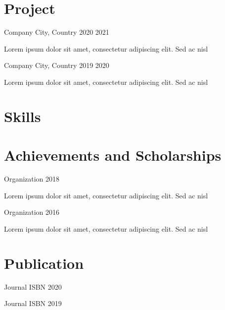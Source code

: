 \documentclass[english]{currivitae-elegant}
\begin{document}
\section[\faProjectDiagram]{Project}
           {Company}
           {City, Country}
           {2020}
           {2021}
           {
            \begin{compactitem}[]
                \item Lorem ipsum dolor sit amet, consectetur adipiscing elit. Sed ac nisl
            \end{compactitem}
           }

           {Company}
           {City, Country}
           {2019}
           {2020}
           {
            \begin{compactitem}[]
                \item Lorem ipsum dolor sit amet, consectetur adipiscing elit. Sed ac nisl
            \end{compactitem}
           }

\section[\faLaptopCode]{Skills}

\section[\faAward]{Achievements and Scholarships}
            {Organization}
            {}
            {}
            {2018}
            {
            \begin{compactitem}[]
                \item Lorem ipsum dolor sit amet, consectetur adipiscing elit. Sed ac nisl
            \end{compactitem}
           }

            {Organization}
            {}
            {}
            {2016}
            {
            \begin{compactitem}[]
                \item Lorem ipsum dolor sit amet, consectetur adipiscing elit. Sed ac nisl
            \end{compactitem}
           }

\section[\faNewspaper]{Publication}
            {Journal}
            {ISBN}
            {}
            {2020}
            {}

            {Journal}
            {ISBN}
            {}
            {2019}
            {}
\end{document}
